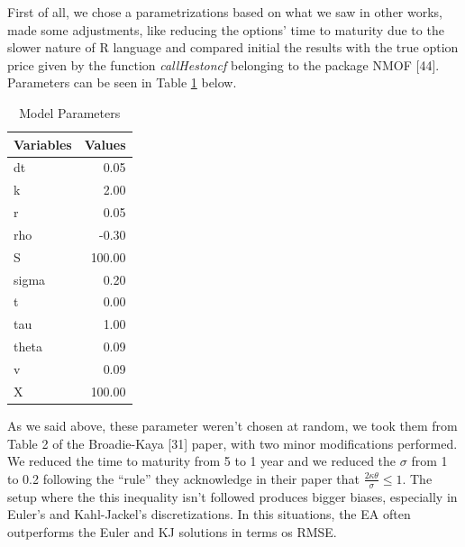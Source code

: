 \documentclass[12pt,twoside]{reedthesis}
\theoremstyle{definition}
\theoremstyle{definition}
\theoremstyle{remark}
\begin{document}
  First of all, we chose a parametrizations based on what we saw in other
  works, made some adjustments, like reducing the options' time to
  maturity due to the slower nature of R language and compared initial the
  results with the true option price given by the function
  \emph{callHestoncf} belonging to the package NMOF {[}44{]}. Parameters
  can be seen in Table \ref{param} below.
  \begin{table}[ht]
  \centering
  \begingroup\fontsize{9pt}{11pt}\selectfont
  \begin{tabular}{lr}
    \hline 
  Variables & Values \\ 
    \hline 
  dt & 0.05 \\ 
    k & 2.00 \\ 
    r & 0.05 \\ 
    rho & -0.30 \\ 
    S & 100.00 \\ 
    sigma & 0.20 \\ 
    t & 0.00 \\ 
    tau & 1.00 \\ 
    theta & 0.09 \\ 
    v & 0.09 \\ 
    X & 100.00 \\ 
     \hline 
  \end{tabular}
  \endgroup
  \caption{Model Parameters} 
  \label{param}
  \end{table}
  As we said above, these parameter weren't chosen at random, we took them
  from Table 2 of the Broadie-Kaya {[}31{]} paper, with two minor
  modifications performed. We reduced the time to maturity from 5 to 1
  year and we reduced the \(\sigma\) from 1 to 0.2 following the ``rule''
  they acknowledge in their paper that
  \(\frac{2 \kappa \theta}{\sigma} \leq 1\). The setup where the this
  inequality isn't followed produces bigger biases, especially in Euler's
  and Kahl-Jackel's discretizations. In this situations, the EA often
  outperforms the Euler and KJ solutions in terms os RMSE.
  
\end{document}
